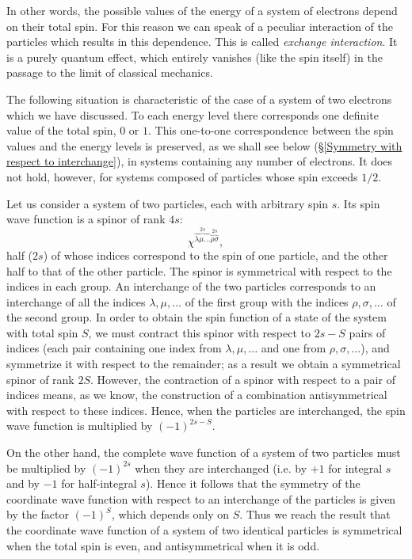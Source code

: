 In other words, the possible values of the energy of a system of electrons depend on their total spin. For this reason we can speak of a peculiar interaction of the particles which results in this dependence. This is called \textit{exchange interaction}. It is a purely quantum effect, which entirely vanishes (like the spin itself) in the passage to the limit of classical mechanics.

The following situation is characteristic of the case of a system of two electrons which we have discussed. To each energy level there corresponds one definite value of the total spin, $ 0 $ or $ 1 $. This one-to-one correspondence between the spin values and the energy levels is preserved, as we shall see below (\S\ref{Symmetry with respect to interchange}), in systems containing any number of electrons. It does not hold, however, for systems composed of particles whose spin exceeds $ 1/2 $.

Let us consider a system of two particles, each with arbitrary spin $ s $. Its spin wave function is a spinor of rank $ 4s $:
\[ \chi^{\overbrace{\lambda\mu\dots}^{2s}\overbrace{\rho\sigma}^{2s}}, \]
half ($ 2s $) of whose indices correspond to the spin of one particle, and the other half to that of the other particle. The spinor is symmetrical with respect to the indices in each group. An interchange of the two particles corresponds to an interchange of all the indices $ \lambda,\mu,\dots $ of the first group with the indices $ \rho, \sigma, \dots $ of the second group. In order to obtain the spin function of a state of the system with total spin $ S $, we must contract this spinor with respect to $ 2s - S $ pairs of indices (each pair containing one index from $ \lambda,\mu,\dots $ and one from $ \rho, \sigma, \dots $), and symmetrize it with respect to the remainder; as a result we obtain a symmetrical spinor of rank $ 2S $. However, the contraction of a spinor with respect to a pair of indices means, as we know, the construction of a combination antisymmetrical with respect to these indices. Hence, when the particles are interchanged, the spin wave function is multiplied by $ (-1)^{2s-S} $.

On the other hand, the complete wave function of a system of two particles must be multiplied by $ (-1)^{2s} $ when they are interchanged (i.e. by $ +1 $ for integral $ s $ and by $ -1 $ for half-integral $ s $). Hence it follows that the symmetry of the coordinate wave function with respect to an interchange of the particles is given by the factor $ (-1)^S $, which depends only on $ S $. Thus we reach the result that the coordinate wave function of a system of two identical particles is symmetrical when the total spin is even, and antisymmetrical when it is odd.


